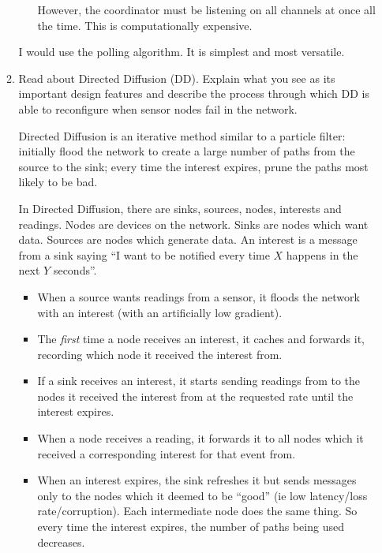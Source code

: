 \documentclass[10pt,\jkfside,a4paper]{article}
\begin{document}
\begin{enumerate}[label=(\alph*)]
\begin{enumerate}[label=(\roman*)]
\begin{itemize}
However, the coordinator must be listening on all channels at once all the
time. This is computationally expensive.

\end{itemize}

I would use the polling algorithm. It is simplest and most versatile.

\item Read about Directed Diffusion (DD). Explain what you see as its
important design features and describe the process through which DD is able
to reconfigure when sensor nodes fail in the network.

Directed Diffusion is an iterative method similar to a particle filter:
initially flood the network to create a large number of paths from the
source to the sink; every time the interest expires, prune the paths most
likely to be bad.

In Directed Diffusion, there are sinks, sources, nodes, interests and readings.
Nodes are devices on the network. Sinks are nodes which want data. Sources are
nodes which generate data. An interest is a message from a sink saying ``I
want to be notified every time $X$ happens in the next $Y$ seconds''.

\begin{itemize}

\item When a source wants readings from a sensor, it floods the network with
an interest (with an artificially low gradient).

\item The \textit{first} time a node receives an interest, it caches and
forwards it, recording which node it received the interest from.

\item If a sink receives an interest, it starts sending readings from to the
nodes it received the interest from at the requested rate until the interest
expires.

\item When a node receives a reading, it forwards it to all nodes which it
received a corresponding interest for that event from.

\item When an interest expires, the sink refreshes it but sends messages
only to the nodes which it deemed to be ``good'' (ie low latency/loss
rate/corruption). Each intermediate node does the same thing. So every time
the interest expires, the number of paths being used decreases.


\end{itemize}
\end{enumerate}
\end{enumerate}
\end{document}
